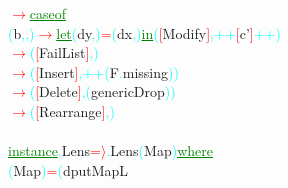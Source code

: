 \textcolor{red}{\ensuremath{\rightarrow}}\hsspace \textcolor{green}{\underline{case}}\hsspace \textcolor{green}{\underline{of}}\\\hstab {}\hsspace \textcolor{cyan}{(}{\rm{}b}\textcolor{cyan}{,}\textcolor{cyan}{,}\textcolor{cyan}{)}\hsspace \textcolor{red}{\ensuremath{\rightarrow}}\hsspace \textcolor{green}{\underline{let}}\hsspace \textcolor{cyan}{(}{\rm{}dy}\textcolor{cyan}{,}\textcolor{cyan}{)}\hsspace \textcolor{red}{=}\hsspace \textcolor{cyan}{(}{\rm{}dx}\textcolor{cyan}{,}\textcolor{cyan}{)}\hsspace \textcolor{green}{\underline{in}}\hsspace \textcolor{cyan}{(}\textcolor{red}{[}{\rm{}Modify}\textcolor{red}{]}\textcolor{cyan}{,}\hsspace \textcolor{cyan}{++}\hsspace \textcolor{red}{[}{\rm{}c'}\textcolor{red}{]}\hsspace \textcolor{cyan}{++}\textcolor{cyan}{)}\\\hstab {}\hsspace \hsspace \hsspace \hsspace \hsspace \hsspace \hsspace \hsspace \textcolor{red}{\ensuremath{\rightarrow}}\hsspace \textcolor{cyan}{(}\textcolor{red}{[}{\rm{}FailList}\textcolor{red}{]}\textcolor{cyan}{,}\textcolor{cyan}{)}\\\hsspace \hsspace \hsspace \hsspace \textcolor{red}{\ensuremath{\rightarrow}}\hsspace \textcolor{cyan}{(}\textcolor{red}{[}{\rm{}Insert}\textcolor{red}{]}\textcolor{cyan}{,}\hsspace \textcolor{cyan}{++}\hsspace \textcolor{cyan}{(}{\rm{}F}\textcolor{cyan}{.}{\rm{}missing}\textcolor{cyan}{)}\textcolor{cyan}{)}\\\hsspace \hsspace \hsspace \hsspace \textcolor{red}{\ensuremath{\rightarrow}}\hsspace \textcolor{cyan}{(}\textcolor{red}{[}{\rm{}Delete}\textcolor{red}{]}\textcolor{cyan}{,}\hsspace \textcolor{cyan}{(}{\rm{}genericDrop}\textcolor{cyan}{)}\textcolor{cyan}{)}\\\hsspace \textcolor{red}{\ensuremath{\rightarrow}}\hsspace \textcolor{cyan}{(}\textcolor{red}{[}{\rm{}Rearrange}\textcolor{red}{]}\textcolor{cyan}{,}\textcolor{cyan}{)}\\\\\textcolor{green}{\underline{instance}}\textcolor{cyan}{.}{\rm{}Lens}\hsspace \textcolor{red}{=\ensuremath{\rangle}}\textcolor{cyan}{.}{\rm{}Lens}\hsspace \textcolor{cyan}{(}{\rm{}Map}\textcolor{cyan}{)}\hsspace \textcolor{green}{\underline{where}}\\\hsspace \textcolor{cyan}{(}{\rm{}Map}\textcolor{cyan}{)}\hsspace \textcolor{red}{=}\hsspace \textcolor{cyan}{(}{\rm{}dputMapL}\hsspace 